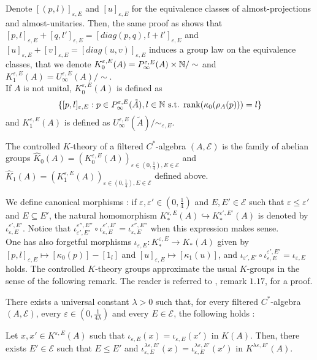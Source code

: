 Denote $[(p,l)]_{\varepsilon,E}$ and $[u]_{\varepsilon,E}$ for the equivalence classes of almost-projections and almost-unitaries. Then, the same proof as \cite{OY2} shows that $[p,l]_{\varepsilon,E}+[q,l']_{\varepsilon,E}=[diag(p,q),l+l']_{\varepsilon,E}$ and $[u]_{\varepsilon,E}+[v]_{\varepsilon,E}=[diag(u,v)]_{\varepsilon,E}$ induces a group law on the equivalence classes, that we denote $K_0^{\varepsilon,E}(A) = P^{\varepsilon, E}_\infty(A)\times \mathbb N / \sim$ and $K_1^{\varepsilon,E}(A) = U^{\varepsilon, E}_\infty(A) / \sim$.\\

If $A$ is not unital, $K_0^{\varepsilon,E}(A)$ is defined as
\[\{[p,l]_{\varepsilon,E} : p\in P^{\varepsilon,E}_\infty (\tilde A), l\in \mathbb N \text{ s.t. rank}(\kappa_0(\rho_A(p)))=l \}\]
and $K_1^{\varepsilon,E}(A)$ is defined as $U_\infty^{\varepsilon,E}(\tilde A)/ \sim_{\varepsilon,E}$.\\

\begin{definition}
The controlled $K$-theory of a filtered $C^*$-algebra $(A,\mathcal E)$ is the family of abelian groups $\hat K_0(A) = (K_0^{\varepsilon,E}(A))_{\varepsilon\in (0,\frac{1}{4}),E\in\mathcal E}$ and $\hat K_1(A) = (K_1^{\varepsilon,E}(A))_{\varepsilon\in (0,\frac{1}{4}),E\in\mathcal E}$ defined above.\\
\end{definition}

We define canonical morphisms : if $\varepsilon, \varepsilon'\in (0,\frac{1}{4})$ and $E,E'\in\mathcal E$ such that $\varepsilon \leq \varepsilon'$ and $E \subseteq E'$, the natural homomorphism $K_*^{\varepsilon,E}(A)\hookrightarrow K_*^{\varepsilon',E'}(A)$ is denoted by $\iota_{\varepsilon,E}^{\varepsilon',E'}$. Notice that $\iota_{\varepsilon',E'}^{\varepsilon'',E''}\circ\iota_{\varepsilon,E}^{\varepsilon',E'}=\iota_{\varepsilon,E}^{\varepsilon'',E''}$ when this expression makes sense.\\

One has also forgetful morphisms $\iota_{\varepsilon,E} : K_*^{\varepsilon,E}\rightarrow K_*(A)$ given by $[p,l]_{\varepsilon,E} \mapsto [\kappa_0(p)]-[1_l]$ and $[u]_{\varepsilon,E} \mapsto [\kappa_1(u)] $, and 
$\iota_{\varepsilon',E'}\circ\iota_{\varepsilon,E}^{\varepsilon',E'}=\iota_{\varepsilon, E}$ holds. The controlled $K$-theory groups approximate the usual $K$-groups in the sense of the following remark. The reader is referred to \cite{OY2}, remark $1.17$, for a proof.

\begin{rk}\label{approximation}
There exists a universal constant $\lambda >0$ such that, for every filtered $C^*$-algebra $(A,\mathcal E)$, every $\varepsilon\in (0,\frac{1}{4\lambda})$ and every $E\in \mathcal E$, the following holds :

Let $x,x'\in K^{\varepsilon,E}(A)$ such that $ \iota_{\varepsilon,E}(x) = \iota_{\varepsilon,E}(x')$ in $K(A)$. Then, there exists $E'\in\mathcal E$ such that $E\leq E'$ and $\iota_{\varepsilon,E}^{\lambda\varepsilon,E'}(x)=\iota_{\varepsilon,E}^{\lambda\varepsilon,E'}(x')$ in $K^{\lambda\varepsilon,E'}(A)$.
\end{rk}

